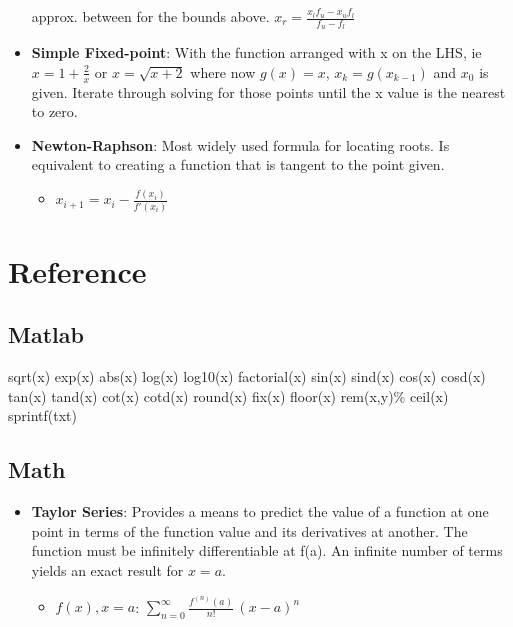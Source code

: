 \documentclass[fontsize=4pt]{scrartcl}
\begin{document}
\begin{multicols}{4}
\begin{itemize}
          approx. between for the bounds above.
          $x_r = \frac{x_lf_u-x_uf_l}{f_u-f_l}$
        \item \textbf{Simple Fixed-point}: With the function arranged with x on the LHS, ie $x = 1+\frac{2}{x}$ or
          $x = \sqrt{x+2}$ where now $g(x) = x$, $x_k = g(x_{k-1})$ and $x_0$ is given. Iterate through solving
          for those points until the x value is the nearest to zero.
        \item \textbf{Newton-Raphson}: Most widely used formula for locating roots. Is equivalent to creating a 
        function that is tangent to the point given.
          \begin{itemize}
            \item $x_{i+1} = x_i - \frac{f(x_i)}{f'(x_i)}$
          \end{itemize}

      \end{itemize}

  \columnbreak

  \section{Reference}
    \subsection{Matlab}
      sqrt(x)
      exp(x)
      abs(x) 
      log(x)
      log10(x)
      factorial(x)
      sin(x)
      sind(x)
      cos(x)
      cosd(x)
      tan(x)
      tand(x)
      cot(x)
      cotd(x)
      round(x)
      fix(x)
      floor(x)
      rem(x,y)\%
      ceil(x)
      sprintf(txt)
    \subsection{Math}
      \begin{itemize}
      \item \textbf{Taylor Series}: Provides a means to predict the value of a function at one point in terms of
             the function value and its derivatives at another. The function must be infinitely differentiable
             at f(a). An infinite number of terms yields an exact result for $x=a$.
        \begin{itemize}
          \item $f(x), x=a$: $\sum_{n=0} ^ {\infty} \frac {f^{(n)}(a)}{n!} \, (x-a)^{n}$
        \end{itemize}
      \end{itemize}
  \end{multicols}
\end{document}
